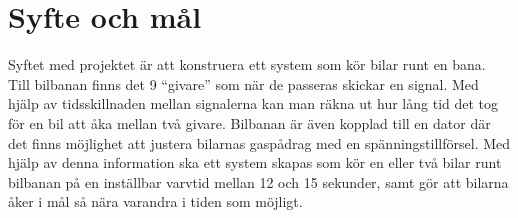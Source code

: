 \section{Syfte och mål}

Syftet med projektet är att konstruera ett system som kör bilar runt en
bana. Till bilbanan finns det 9 ``givare'' som när de passeras skickar en
signal. Med hjälp av tidsskillnaden mellan signalerna kan man räkna ut hur lång
tid det tog för en bil att åka mellan två givare. Bilbanan är även kopplad till
en dator där det finns möjlighet att justera bilarnas gaspådrag med en
spänningstillförsel. Med hjälp av denna information ska ett system skapas som
kör en eller två bilar runt bilbanan på en inställbar varvtid mellan 12 och 15
sekunder, samt gör att bilarna åker i mål så nära varandra i tiden som möjligt.